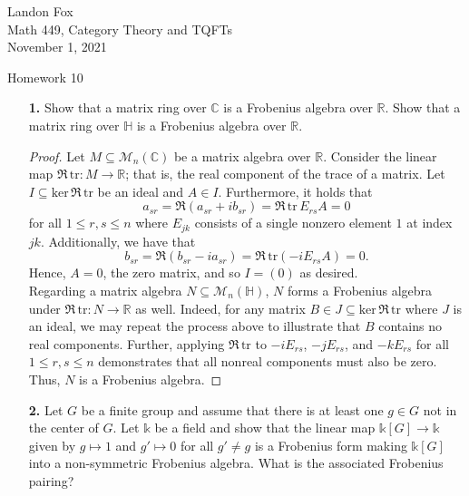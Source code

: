 \documentclass[ 12pt ]{article}
\begin{document}
\noindent Landon Fox \\
\noindent Math 449, Category Theory and TQFTs \\
\noindent November 1, 2021

\begin{center}
\Large Homework 10
\end{center}

\begin{enumerate}

	\item[\textbf{1.}] Show that a matrix ring over $\mathbb{C}$ is a Frobenius algebra over $\mathbb{R}$. Show that a matrix ring over $\mathbb{H}$ is a Frobenius algebra over $\mathbb{R}$.

		\begin{proof}
			Let $M \subseteq \mathcal{M}_n(\mathbb{C})$ be a matrix algebra over $\mathbb{R}$. Consider the linear map $\Re\, \mathrm{tr} : M \to \mathbb{R}$; that is, the real component of the trace of a matrix. Let $I \subseteq \mathrm{ker}\, \Re\, \mathrm{tr}$ be an ideal and $A \in I$. Furthermore, it holds that $$a_{sr} = \Re (a_{sr} + ib_{sr}) = \Re\, \mathrm{tr}\, E_{rs} A = 0$$ for all $1 \leq r, s \leq n$ where $E_{jk}$ consists of a single nonzero element $1$ at index $jk$. Additionally, we have that $$b_{sr} = \Re (b_{sr} - ia_{sr}) = \Re\, \mathrm{tr}(-iE_{rs}A) = 0.$$ Hence, $A = 0$, the zero matrix, and so $I = (0)$ as desired. \\

			Regarding a matrix algebra $N \subseteq \mathcal{M}_n(\mathbb{H})$, $N$ forms a Frobenius algebra under $\Re\, \mathrm{tr} : N \to \mathbb{R}$ as well. Indeed, for any matrix $B \in J \subseteq \mathrm{ker}\, \Re\, \mathrm{tr}$ where $J$ is an ideal, we may repeat the process above to illustrate that $B$ contains no real components. Further, applying $\Re\, \mathrm{tr}$ to $-iE_{rs}$, $-jE_{rs}$, and $-kE_{rs}$ for all $1 \leq r, s \leq n$ demonstrates that all nonreal components must also be zero. Thus, $N$ is a Frobenius algebra.
		\end{proof}


	\item[\textbf{2.}] Let $G$ be a finite group and assume that there is at least one $g \in G$ not in the center of $G$. Let $\mathbb{k}$ be a field and show that the linear map $\mathbb{k}[G] \to \mathbb{k}$ given by $g \mapsto 1$ and $g' \mapsto 0$ for all $g' \neq g$ is a Frobenius form making $\mathbb{k}[G]$ into a non-symmetric Frobenius algebra. What is the associated Frobenius pairing?


\end{enumerate}
\end{document}
